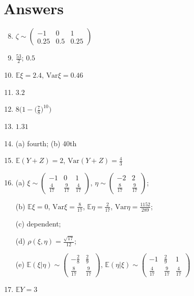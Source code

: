 \documentclass[14pt]{exam}
\newcommand{\EE}{{\ensuremath{\mathbb{E}}}}
\newcommand{\Var}{{\ensuremath{\textrm{Var}}}}
\begin{document}
 	\section*{Answers}
 	\begin{enumerate}
 	\setcounter{enumi}{7}
 	\item $\zeta \sim \begin{pmatrix}
			-1 & 0 & 1\\
			0.25 & 0.5 & 0.25
		\end{pmatrix}$
 	\item $\frac{53}{2}$; $0.5$
 	\item $\EE\xi = 2.4$, $\Var\xi = 0.46$
 	\item $3.2$
 	\item $8 \biggr(1 - \bigr(\frac{7}{8}\bigr)^{10}\biggr)$
 	\item $1.31$
 	\item (a) fourth; (b) 40th
 	\item $\EE(Y+Z) = 2$, $\Var(Y+Z) = \frac{4}{3}$
 	\item (a) $\xi \sim \begin{pmatrix}
			-1 & 0 & 1\\
			\frac{4}{17} & \frac{9}{17} & \frac{4}{17}
		\end{pmatrix}$, $\eta \sim \begin{pmatrix}
			-2 & 2\\
			\frac{8}{17} & \frac{9}{17}\end{pmatrix}$;
			
			(b) $\EE\xi = 0$, $\Var\xi = \frac{8}{17}$, $\EE\eta = \frac{2}{17}$, $\Var\eta = \frac{1152}{289}$;
			
			(c) dependent;
			
			(d) $\rho(\xi, \eta) = \frac{\sqrt{17}}{12}$;
			
			(e) $\EE(\xi|\eta) \sim \begin{pmatrix}
				-\frac{2}{8} & \frac{2}{9}\\
				\frac{8}{17} & \frac{9}{17}
			\end{pmatrix}$, $\EE(\eta|\xi) \sim \begin{pmatrix}
				-1 & \frac{2}{9} & 1\\
				\frac{4}{17} & \frac{9}{17} & \frac{4}{17}
			\end{pmatrix}$
 	\item $\EE Y = 3$
 	\end{enumerate}
\end{document}
